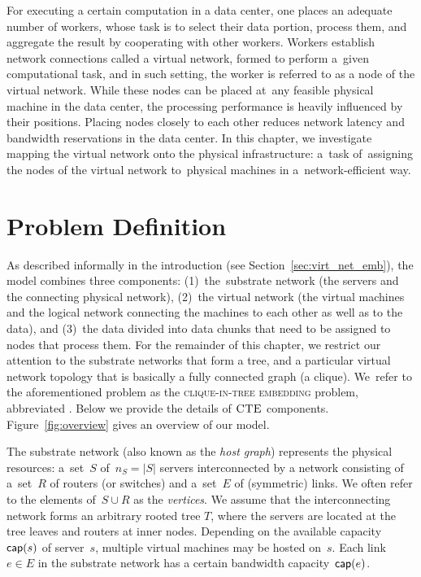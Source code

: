 
For executing a certain computation in a data center, one places an adequate number of workers, whose task is to select their data portion, process them, and aggregate the result by cooperating with other workers.
Workers establish network connections called a virtual network, formed to perform a~given computational task, and in such setting, the worker is referred to as a node of the virtual network.
While these nodes can be placed at~any feasible physical machine in the data center, the processing performance is heavily influenced by their positions.
Placing nodes closely to each other reduces network latency and bandwidth reservations in the data center.
In this chapter, we investigate mapping the virtual network onto the physical infrastructure: a~task of~assigning the nodes of the virtual network to~physical machines in a~network-efficient way.

\section{Problem Definition}\label{sec:model}

As described informally in the introduction (see Section~\ref{sec:virt_net_emb}), the model combines three components: (1)~the~substrate network (the servers
and the connecting physical network),
(2)~the virtual network (the virtual machines and the logical network connecting the machines to each other
as well as to the data), and (3)~the data divided into data chunks that need to be assigned to nodes that process them.
For the remainder of this chapter, we restrict our attention to the substrate networks that form a tree, and a particular virtual network topology that is basically a fully connected graph (a clique).
We~refer to the aforementioned problem as the \textsc{clique-in-tree embedding} problem, abbreviated \CTE.
Below we provide the details of $\textsc{CTE}$ components. Figure~\ref{fig:overview} gives an overview of our model.


 The substrate network (also known as the \emph{host graph}) represents the physical resources:
a~set~$S$ of~$n_S=|S|$ servers interconnected by a network consisting of a~set~$R$ of routers (or switches)
and a~set~$E$ of (symmetric) links. We often refer to the elements of~$S\cup R$
as the \emph{vertices}. We assume that the interconnecting network forms an arbitrary rooted tree $T$,
where the servers are located at the tree leaves and routers at inner nodes.
Depending on the available capacity~$\textsf{cap}(s)$ of server~$s$, multiple virtual machines may be hosted on~$s$.
Each link~$e\in E$ in the substrate network has a certain bandwidth capacity~$\textsf{cap}(e)$.



